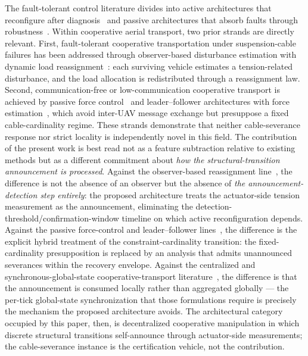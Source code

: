 The fault-tolerant control literature divides into active architectures that reconfigure after diagnosis~\cite{Blanke2015, ZhangJiang2008} and passive architectures that absorb faults through robustness~\cite{Patton1997}. Within cooperative aerial transport, two prior strands are directly relevant. First, fault-tolerant cooperative transportation under suspension-cable failures has been addressed through observer-based disturbance estimation with dynamic load reassignment~\cite{LiuSuspensionFailure2021}: each surviving vehicle estimates a tension-related disturbance, and the load allocation is redistributed through a reassignment law. Second, communication-free or low-communication cooperative transport is achieved by passive force control~\cite{GassnerPassiveForce2017} and leader–follower architectures with force estimation~\cite{NoCommTransport2021}, which avoid inter-UAV message exchange but presuppose a fixed cable-cardinality regime. These strands demonstrate that neither cable-severance response nor strict locality is independently novel in this field. The contribution of the present work is best read not as a feature subtraction relative to existing methods but as a different commitment about \emph{how the structural-transition announcement is processed}. Against the observer-based reassignment line~\cite{LiuSuspensionFailure2021}, the difference is not the absence of an observer but the absence of \emph{the announcement-detection step entirely}: the proposed architecture treats the actuator-side tension measurement as the announcement, eliminating the detection-threshold/confirmation-window timeline on which active reconfiguration depends. Against the passive force-control and leader--follower lines~\cite{GassnerPassiveForce2017, NoCommTransport2021}, the difference is the explicit hybrid treatment of the constraint-cardinality transition: the fixed-cardinality presupposition is replaced by an analysis that admits unannounced severances within the recovery envelope. Against the centralized and synchronous-global-state cooperative-transport literature~\cite{Michael2011, WangOng2017, LiLoianno2023, PallarLi2025, SuBhowmick2023}, the difference is that the announcement is consumed locally rather than aggregated globally --- the per-tick global-state synchronization that those formulations require is precisely the mechanism the proposed architecture avoids. The architectural category occupied by this paper, then, is decentralized cooperative manipulation in which discrete structural transitions self-announce through actuator-side measurements; the cable-severance instance is the certification vehicle, not the contribution.